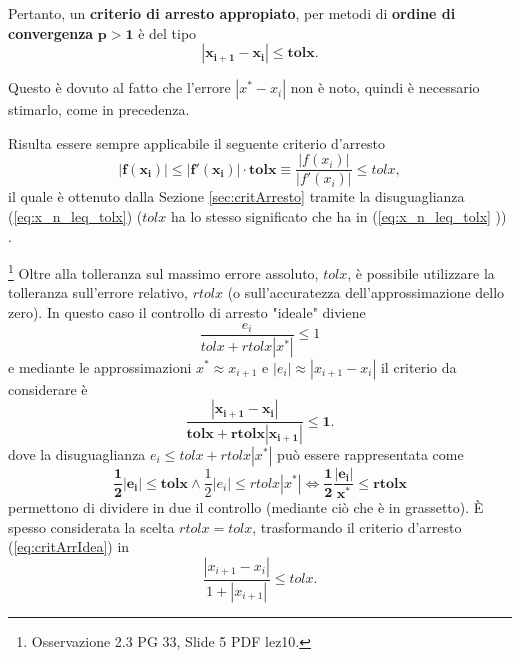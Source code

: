 Pertanto, un \textbf{criterio di arresto appropiato}, per metodi di \textbf{ordine di convergenza} $\boldsymbol{p>1}$ è del tipo
\begin{equation}\label{eq:critArrConvMag1}
	\boldsymbol{|x_{i+1}-x_i|\leq tolx}.
\end{equation}

Questo è dovuto al fatto che l'errore $|x^*-x_i|$ non è noto, quindi è necessario stimarlo, come in precedenza.

\begin{remark}
	Risulta essere sempre applicabile il seguente criterio d'arresto
	\begin{equation}\label{eq:critArrNewt}
		\boldsymbol{|f(x_i)|\leq |f'(x_i)|\cdot tolx}\equiv \frac{|f(x_i)|}{|f'(x_i)|}\leq tolx,
	\end{equation}
	il quale è ottenuto dalla Sezione \ref{sec:critArresto} tramite la disuguaglianza (\ref{eq:x_n_leq_tolx}) ($tolx$ ha lo stesso significato che ha in (\ref{eq:x_n_leq_tolx}
	)) .
\end{remark}

\begin{remark}\footnote{Osservazione 2.3 PG 33, Slide 5 PDF lez10.}
	Oltre alla tolleranza sul massimo errore assoluto, $tolx$, è possibile utilizzare la tolleranza sull'errore relativo, $rtolx$ (o sull'accuratezza dell'approssimazione dello zero). In questo caso il controllo di arresto "ideale" diviene
	\begin{equation*}
		\frac{e_i}{tolx+rtolx|x^*|}\leq 1
	\end{equation*}
	e mediante le approssimazioni $x^*\approx x_{i+1}$ e $|e_i|\approx |x_{i+1}-x_i|$ il criterio da considerare è
	\begin{equation}\label{eq:critArrIdea}
		\boldsymbol{\frac{|x_{i+1}-x_i|}{tolx+rtolx|x_{i+1}|}\leq 1}.
	\end{equation}
	dove la disuguaglianza $e_i\leq tolx+rtolx|x^*|$ può essere rappresentata come
	\begin{equation*}
		\boldsymbol{\frac{1}{2}|e_i|\leq tolx} \wedge \frac{1}{2}|e_i|\leq rtolx|x^*| \iff \boldsymbol{\frac{1}{2}\frac{|e_i|}{x^*}\leq rtolx}
	\end{equation*}
	permettono di dividere in due il controllo (mediante ciò che è in grassetto). È spesso considerata la scelta $rtolx=tolx$, trasformando il criterio d'arresto (\ref{eq:critArrIdea}) in
	\begin{equation*}
		\frac{|x_{i+1}-x_i|}{1+|x_{i+1}|}\leq tolx.
	\end{equation*}
\end{remark}

